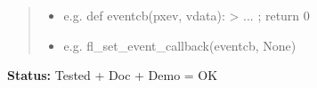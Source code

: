 \begin{boxedminipage}{\funcwidth}
\begin{quote}
\begin{itemize}
  \item
    \setlength{\parskip}{0.6ex}

e.g. def eventcb(pxev, vdata): > ... ; return 0


  \item 
e.g. fl\_set\_event\_callback(eventcb, None)


\end{itemize}

\end{quote}

\textbf{Status:} 
Tested + Doc + Demo = OK


    \end{boxedminipage}

    \label{xformslib:flxbasic:fl_set_idle_callback}

    \vspace{0.5ex}

